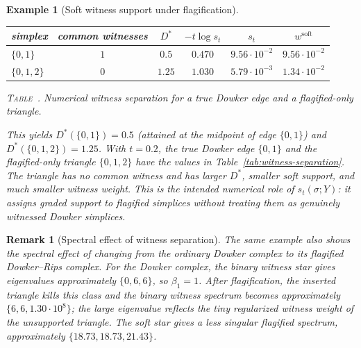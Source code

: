 \documentclass[11pt]{amsart}
\theoremstyle{plain}
\newtheorem{example}[theorem]{Example}
\newtheorem{remark}[theorem]{Remark}
\begin{document}
\begin{example}[Soft witness support under flagification]
\begin{center}
\end{center}

\begin{center}
\normalfont
{}\label{tab:witness-separation}
\begin{tabular}{lccccc}
\hline
simplex & common witnesses & $D^*$ & $-t\log s_t$ & $s_t$ & $w^{\mathrm{soft}}$\\
\hline
$\{0,1\}$ & $1$ & $0.5$ & $0.470$ & $9.56\cdot 10^{-2}$ & $9.56\cdot 10^{-2}$\\
$\{0,1,2\}$ & $0$ & $1.25$ & $1.030$ & $5.79\cdot 10^{-3}$ & $1.34\cdot 10^{-2}$\\
\hline
\end{tabular}
\par\vspace{0.5em}
\textsc{Table~\thetable.} Numerical witness separation for a true Dowker edge and a
flagified-only triangle.
\end{center}
This yields $D^*(\{0,1\})=0.5$ (attained at the midpoint of edge $\{0,1\}$) and
$D^*(\{0,1,2\})=1.25$. With
$t=0.2$, the true Dowker edge $\{0,1\}$ and the flagified-only triangle $\{0,1,2\}$ have the values
in Table~\ref{tab:witness-separation}. The triangle has no common witness and has larger $D^*$,
smaller soft support, and much smaller witness weight. This is the intended numerical role of
$s_t(\sigma;Y)$: it assigns graded support to flagified simplices without treating them as genuinely
witnessed Dowker simplices.
\end{example}


\begin{remark}[Spectral effect of witness separation]
The same example also shows the spectral effect of changing from the ordinary Dowker complex to its
flagified Dowker--Rips complex. For the Dowker complex, the binary witness star gives eigenvalues
approximately $\{0,6,6\}$, so $\beta_1=1$. After flagification, the inserted triangle kills this
class and the binary witness spectrum becomes approximately
$\{6,6,1.30\cdot10^8\}$; the large eigenvalue reflects the tiny regularized witness weight of the
unsupported triangle. The soft star gives a less singular flagified spectrum,
approximately $\{18.73,18.73,21.43\}$.
\end{remark}
\end{document}
